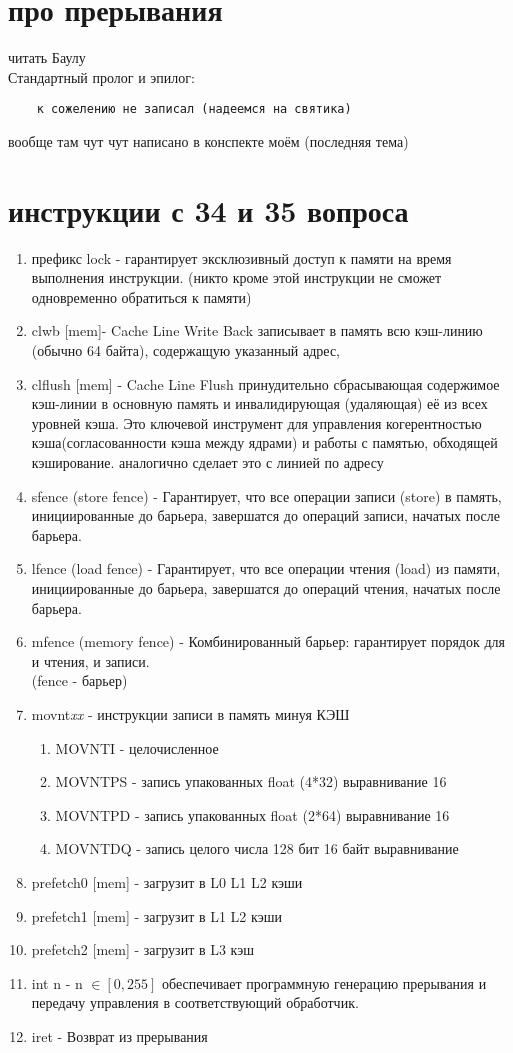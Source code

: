 \documentclass[a4paper,10pt]{article}
\begin{document}
\section*{про прерывания}
читать Баулу \\ Стандартный пролог и эпилог:
\begin{verbatim}
    к сожелению не записал (надеемся на святика)
\end{verbatim}
вообще там чут чут написано в конспекте моём (последняя тема)
\section*{инструкции с 34 и 35 вопроса}
\begin{enumerate}
    \item префикс lock - гарантирует эксклюзивный доступ к памяти на время выполнения инструкции. (никто кроме этой инструкции не сможет одновременно обратиться к памяти)
    \item clwb [mem]- Cache Line Write Back записывает в память всю кэш-линию (обычно 64 байта), содержащую указанный адрес, 
    \item clflush [mem] - Cache Line Flush принудительно сбрасывающая содержимое кэш-линии в основную память и инвалидирующая (удаляющая) её из всех уровней кэша. Это ключевой инструмент для управления когерентностью кэша(согласованности кэша между ядрами) и работы с памятью, обходящей кэширование. аналогично сделает это с линией по адресу
    \item sfence (store fence) - Гарантирует, что все операции записи (store) в память, инициированные до барьера, завершатся до операций записи, начатых после барьера.
    \item lfence (load fence) - Гарантирует, что все операции чтения (load) из памяти, инициированные до барьера, завершатся до операций чтения, начатых после барьера.
    \item mfence (memory fence) - Комбинированный барьер: гарантирует порядок для и чтения, и записи. \\
    (fence - барьер)
    \item movnt\textit{xx} - инструкции записи в память минуя КЭШ
    \begin{enumerate}
        \item MOVNTI - целочисленное
        \item MOVNTPS - запись упакованных float (4*32) выравнивание 16
        \item MOVNTPD - запись упакованных float (2*64) выравнивание 16
        \item MOVNTDQ - запись целого числа 128 бит 16 байт выравнивание
    \end{enumerate}
    \item prefetch0 [mem] - загрузит в L0 L1 L2 кэши 
    \item prefetch1 [mem] - загрузит в L1 L2 кэши
    \item prefetch2 [mem] - загрузит в L3 кэш
    \item int n - n $\in [0, 255]$  обеспечивает программную генерацию прерывания и передачу управления в соответствующий обработчик.
    \item iret - Возврат из прерывания
\end{enumerate}
\end{document}
